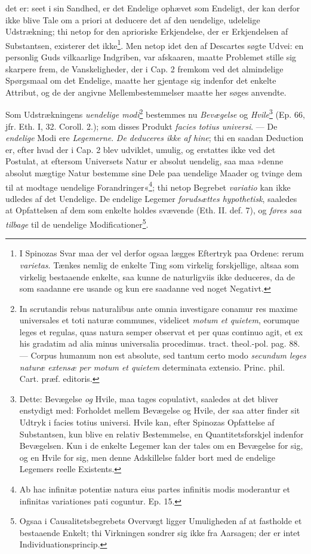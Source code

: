 \documentclass[12pt,a4paper]{book}
\newcommand{\opage}[1]{\marginnote{\footnotesize\textit{[#1]}}}
\begin{document}
det er: seet i sin Sandhed, er det Endelige ophævet som Endeligt,
der kan derfor ikke blive Tale om a priori at deducere det af den
uendelige, udelelige Udstrækning; thi netop for den aprioriske
Erkjendelse, der er Erkjendelsen af Substantsen, existerer det
ikke\footnote{I Spinozas Svar maa der vel derfor ogsaa lægges
Eftertryk paa Ordene: rerum \emph{varietas}. Tænkes nemlig de enkelte
Ting som virkelig forskjellige, altsaa som virkelig bestaaende
enkelte, saa kunne de naturligviis ikke deduceres, da de som
saadanne ere usande og kun ere saadanne ved noget Negativt.}. Men
\opage{78} \setcounter{footnote}{0}%
netop idet den af Descartes søgte Udvei: en personlig Guds
vilkaarlige Indgriben, var afskaaren, maatte Problemet stille sig
skarpere frem, de Vanskeligheder, der i Cap. 2 fremkom ved det
almindelige Spørgsmaal om det Endelige, maatte her gjentage sig
indenfor det enkelte Attribut, og de der angivne
Mellembestemmelser maatte her søges anvendte.

Som Udstrækningens \emph{uendelige modi}\footnote{In scrutandis rebus
naturalibus ante omnia investigare conamur res maxime universales
et toti naturæ communes, videlicet \emph{motum et quietem}, eorumque
leges et regulas, quas natura semper observat et per quas
continuo agit, et ex his gradatim ad alia minus universalia
procedimus. tract. theol.-pol. pag. 88. --- Corpus humanum non
est absolute, sed tantum certo modo \emph{secundum leges naturæ
extensæ per motum et quietem} determinata extensio. Princ. phil.
Cart. præf. editoris.} bestemmes nu \emph{Bevægelse} og
\emph{Hvile}\footnote{Dette: Bevægelse \emph{og} Hvile, maa tages copulativt,
saaledes at det bliver enstydigt med: Forholdet mellem Bevægelse
og Hvile, der saa atter finder sit Udtryk i facies totius
universi. Hvile kan, efter Spinozas Opfattelse af Substantsen,
kun blive en relativ Bestemmelse, en Quantitetsforskjel indenfor
Bevægelsen. Kun i de enkelte Legemer kan der tales om en
Bevægelse for sig, og en Hvile for sig, men denne Adskillelse
falder bort med de endelige Legemers reelle Existents.} (Ep. 66,
jfr. Eth. I, 32. Coroll. 2.); som disses Produkt \emph{facies totius
universi}. --- De \emph{endelige} Modi ere \emph{Legemerne}. \emph{De deduceres
ikke af hine}; thi en saadan Deduction er, efter hvad der i Cap. 2
blev udviklet, umulig, og erstattes ikke ved det Postulat, at
eftersom Universets Natur er absolut uendelig, saa maa »denne
absolut mægtige Natur bestemme sine Dele paa uendelige Maader og
tvinge dem til at modtage uendelige
Forandringer«\footnote{Ab hac infinitæ potentiæ natura eius
partes infinitis modis moderantur et infinitas variationes pati
coguntur. Ep. 15.}; thi netop Begrebet \emph{variatio} kan ikke
udledes af det Uendelige. De endelige Legemer \emph{forudsættes
hypothetisk}, saaledes at Opfattelsen af dem
\opage{79} \setcounter{footnote}{0}%
som enkelte holdes svævende (Eth. II. def. 7), og \emph{føres saa
tilbage} til de uendelige Modificationer\footnote{Ogsaa i
Causalitetsbegrebets Overvægt ligger Umuligheden af at fastholde
et bestaaende Enkelt; thi Virkningen sondrer sig ikke fra
Aarsagen; der er intet Individuationsprincip.}.
\end{document}
